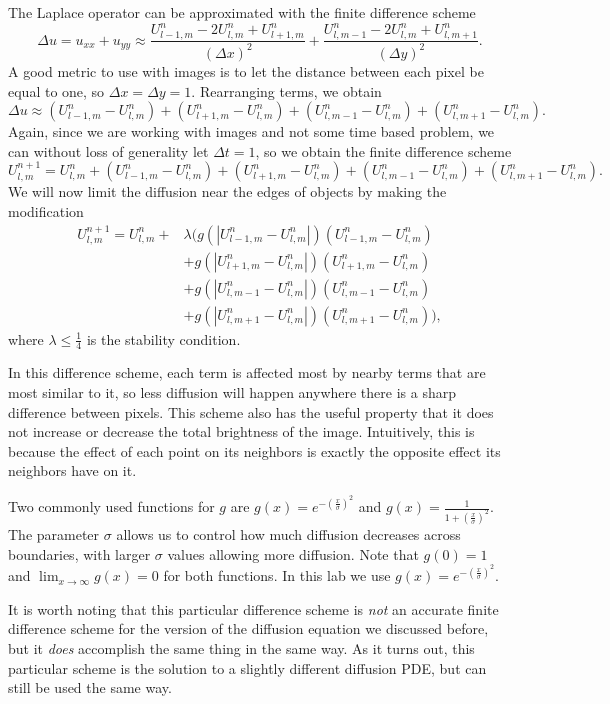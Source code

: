 The Laplace operator can be approximated with the finite difference scheme
\[\Delta u = u_{xx}+u_{yy} \approx \frac{U_{l-1,m}^n - 2 U_{l,m}^n + U_{l+1,m}^n}{(\Delta x)^2} + \frac{U_{l,m-1}^n-2 U_{l,m}^n + U_{l,m+1}^n}{(\Delta y)^2}.\]
A good metric to use with images is to let the distance between each pixel be equal to one, so $\Delta x = \Delta y = 1$. 
Rearranging terms, we obtain
\[\Delta u \approx (U_{l-1,m}^n - U_{l,m}^n) + (U_{l+1,m}^n - U_{l,m}^n) + (U_{l,m-1}^n - U_{l,m}^n) + (U_{l,m+1}^n - U_{l,m}^n).\]
Again, since we are working with images and not some time based problem, we can without loss of generality let $\Delta t = 1$, so we obtain the finite difference scheme
\[U_{l,m}^{n+1} = U_{l,m}^n + (U_{l-1,m}^n - U_{l,m}^n) + (U_{l+1,m}^n - U_{l,m}^n) + (U_{l,m-1}^n - U_{l,m}^n) + (U_{l,m+1}^n - U_{l,m}^n).\]
We will now limit the diffusion near the edges of objects by making the modification
\begin{align*}
U_{l,m}^{n+1} = U_{l,m}^n + & \lambda \Big(g(|U_{l-1,m}^n - U_{l,m}^n|)(U_{l-1,m}^n - U_{l,m}^n) \\
			&+ g(|U_{l+1,m}^n - U_{l,m}^n|)(U_{l+1,m}^n - U_{l,m}^n) \\
			&+ g(|U_{l,m-1}^n - U_{l,m}^n|)(U_{l,m-1}^n - U_{l,m}^n) \\
			&+ g(|U_{l,m+1}^n - U_{l,m}^n|)(U_{l,m+1}^n - U_{l,m}^n)\Big),
\end{align*}
where $\lambda \leq \frac{1}{4}$ is the stability condition. 

In this difference scheme, each term is affected most by nearby terms that are most similar to it, so less diffusion will happen anywhere there is a sharp difference between pixels.
This scheme also has the useful property that it does not increase or decrease the total brightness of the image.
Intuitively, this is because the effect of each point on its neighbors is exactly the opposite effect its neighbors have on it.

Two commonly used functions for $g$ are $g(x) = e^{-\left(\frac{x}{\sigma}\right)^2}$ and $g(x) = \frac{1}{1+\left(\frac{x}{\sigma}\right)^2}$.
The parameter $\sigma$ allows us to control how much diffusion decreases across boundaries, with larger $\sigma$ values allowing more diffusion.
Note that $g(0) = 1$ and $\displaystyle{\lim_{x\to \infty} g(x) = 0}$ for both functions.
In this lab we use $g(x)=e^{-\left(\frac{x}{\sigma}\right)^2}$.

It is worth noting that this particular difference scheme is \textit{not} an accurate finite difference scheme for the version of the diffusion equation we discussed before, but it \textit{does} accomplish the same thing in the same way.
As it turns out, this particular scheme is the solution to a slightly different diffusion PDE, but can still be used the same way.

